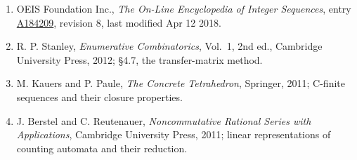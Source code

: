 \documentclass[11pt]{article}
\theoremstyle{definition}
\begin{document}
\begin{enumerate}

\item OEIS Foundation Inc., \emph{The On-Line Encyclopedia of Integer Sequences}, entry \href{https://oeis.org/A184209}{A184209}, revision 8, last modified Apr 12 2018.

\item R. P. Stanley, \emph{Enumerative Combinatorics}, Vol.~1, 2nd ed., Cambridge University Press, 2012; \S4.7, the transfer-matrix method.

\item M. Kauers and P. Paule, \emph{The Concrete Tetrahedron}, Springer, 2011; C-finite sequences and their closure properties.

\item J. Berstel and C. Reutenauer, \emph{Noncommutative Rational Series with Applications}, Cambridge University Press, 2011; linear representations of counting automata and their reduction.

\end{enumerate}
\end{document}
